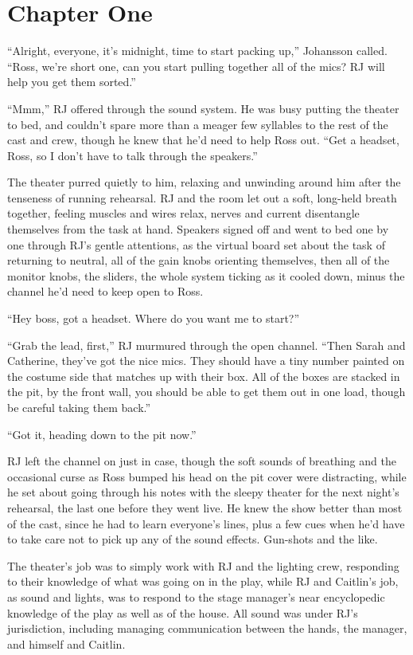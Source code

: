 \chapter*{Chapter One}

``Alright, everyone, it's midnight, time to start packing up,'' Johansson called.  ``Ross, we're short one, can you start pulling together all of the mics?  RJ will help you get them sorted.''

``Mmm,'' RJ offered through the sound system.  He was busy putting the theater to bed, and couldn't spare more than a meager few syllables to the rest of the cast and crew, though he knew that he'd need to help Ross out.  ``Get a headset, Ross, so I don't have to talk through the speakers.''

The theater purred quietly to him, relaxing and unwinding around him after the tenseness of running rehearsal.  RJ and the room let out a soft, long-held breath together, feeling muscles and wires relax, nerves and current disentangle themselves from the task at hand.  Speakers signed off and went to bed one by one through RJ's gentle attentions, as the virtual board set about the task of returning to neutral, all of the gain knobs orienting themselves, then all of the monitor knobs, the sliders, the whole system ticking as it cooled down, minus the channel he'd need to keep open to Ross.

``Hey boss, got a headset.  Where do you want me to start?''

``Grab the lead, first,'' RJ murmured through the open channel.  ``Then Sarah and Catherine, they've got the nice mics.  They should have a tiny number painted on the costume side that matches up with their box.  All of the boxes are stacked in the pit, by the front wall, you should be able to get them out in one load, though be careful taking them back.''

``Got it, heading down to the pit now.''

RJ left the channel on just in case, though the soft sounds of breathing and the occasional curse as Ross bumped his head on the pit cover were distracting, while he set about going through his notes with the sleepy theater for the next night's rehearsal, the last one before they went live.  He knew the show better than most of the cast, since he had to learn everyone's lines, plus a few cues when he'd have to take care not to pick up any of the sound effects.  Gun-shots and the like.

The theater's job was to simply work with RJ and the lighting crew, responding to their knowledge of what was going on in the play, while RJ and Caitlin's job, as sound and lights, was to respond to the stage manager's near encyclopedic knowledge of the play as well as of the house.  All sound was under RJ's jurisdiction, including managing communication between the hands, the manager, and himself and Caitlin.


